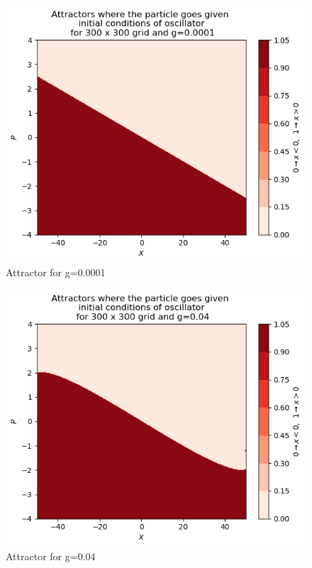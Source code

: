 \documentclass[idxtotoc,hyperref,openany]{labbook} %
\begin{document}
\begin{figure}[H] %
\begin{center}
\includegraphics[width=1\linewidth]{attractor001.png}
\end{center}
\caption{Attractor for g=0.0001}
\label{Attractorg0-0001}
\end{figure}

\begin{figure}[H] %
\begin{center}
\includegraphics[width=1\linewidth]{attractor008.png}
\end{center}
\caption{Attractor for g=0.04}
\label{Attractorg0-04}
\end{figure}
\end{document}
